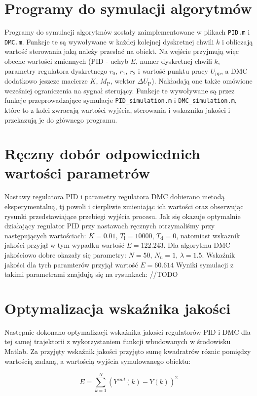 \section{Programy do symulacji algorytmów}
Programy do symulacji algorytmów zostały zaimplementowane w plikach \texttt{PID.m} i \texttt{DMC.m}. Funkcje te są wywoływane w każdej kolejnej dyskretnej chwili $k$ i obliczają wartość sterowania jaką należy przesłać na obiekt. Na wejście przyjmują więc obecne wartości zmiennych (PID - uchyb $E$, numer dyskretnej chwili $k$, parametry regulatora dyskretnego $r_{\mathrm{0}}$, $r_{\mathrm{1}}$, $r_{\mathrm{2}}$ i wartość punktu pracy $U_{\mathrm{pp}}$, a DMC dodatkowo jeszcze macierze $K$, $M_{\mathrm{P}}$, wektor $\Delta U_{\mathrm{P}}$). Nakładają one także omówione wcześniej ograniczenia na sygnał sterujący. Funkcje te wywoływane są przez funkcje przeprowadzające symulacje \texttt{PID\_simulation.m} i \texttt{DMC\_simulation.m}, które to z kolei zwracają wartości wyjścia, sterowania i wskaznika jakości i przekazują je do głównego programu.

\section{Ręczny dobór odpowiednich wartości parametrów}
Nastawy regulatora PID i parametry regulatora DMC dobierano metodą eksperymentalną, tj powoli i cierpliwie zmieniając ich wartości oraz obserwując rysunki przedstawiające przebiegi wyjścia procesu. Jak się okazuje optymalnie działający regulator PID przy nastawach ręcznych otrzymaliśmy przy następujących wartościach: $K=\num{0.01}$, $T_\mathrm{i}=10000$, $T_\mathrm{d}=0$, natomiast wskaznik jakości przyjął w tym wypadku wartość $E=\num{122.243}$. Dla algorytmu DMC jakościowo dobre okazały się parametry: $N=50$, $N_\mathrm{u}=1$, $\lambda=\num{1.5}$. Wskaźnik jakości dla tych paramterów przyjął wartość $E=\num{60.614}$  Wyniki symulacji z takimi parametrami znajdują się na rysunkach: //TODO
\section{Optymalizacja wskaźnika jakości}
Następnie dokonano optymalizacji wskaźnika jakości regulatorów PID i DMC dla tej samej trajektorii z wykorzystaniem funkcji wbudowanych w środowisku Matlab. Za przyjęty wskaźnik jakości przyjęto sumę kwadratrów róznic pomiędzy wartością zadaną, a wartością wyjścia symulowanego obiektu:

\begin{equation}
E = \sum_{k=1}^{N} (Y^{zad}(k)-Y(k))^2
\end{equation}

